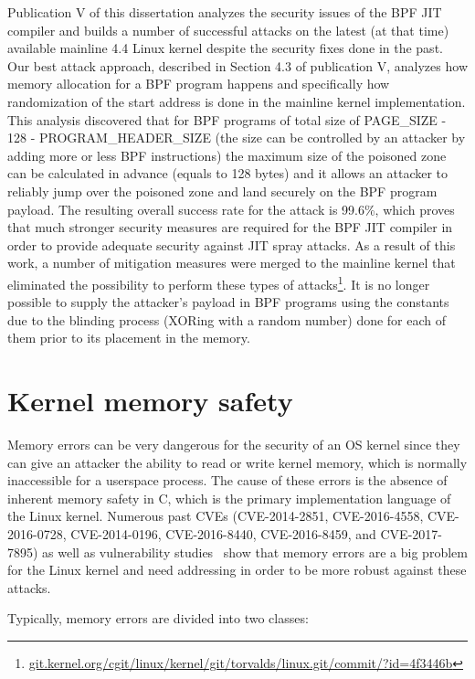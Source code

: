 Publication V of this dissertation analyzes the security issues of the BPF JIT compiler and builds a number of successful attacks on the latest (at that time) available mainline 4.4 Linux kernel despite the security fixes done in the past. 
Our best attack approach, described in Section 4.3 of publication V, analyzes how memory allocation for a BPF program happens and specifically how randomization of the start address is done in the mainline kernel implementation. 
This analysis discovered that for BPF programs of total size of PAGE\_SIZE - 128 - PROGRAM\_HEADER\_SIZE (the size can be controlled by an attacker by adding more or less BPF instructions) the maximum size of the poisoned zone can be calculated in advance (equals to 128 bytes) and it allows an attacker to reliably jump over the poisoned zone and land securely on the BPF program payload. The resulting overall success rate for the attack is 99.6\%, which proves that much stronger security measures are required for the BPF JIT compiler in order to provide adequate security against JIT spray attacks. As a result of this work, a number of mitigation measures were merged to the mainline kernel that eliminated the possibility to perform these types of attacks\footnote{\url{git.kernel.org/cgit/linux/kernel/git/torvalds/linux.git/commit/?id=4f3446b}}. It is no longer possible to supply the attacker's payload in BPF programs using the constants due to the blinding process (XORing with a random number) done for each of them prior to its placement in the memory.

\section{Kernel memory safety}
\label{sec:kern-mem-safety}

Memory errors can be very dangerous for the security of an OS kernel since they can give an attacker the ability to read or write kernel memory, which is normally inaccessible for a userspace process. The cause of these errors is the absence of inherent memory safety in C, which is the primary implementation language of the Linux kernel. 
Numerous past CVEs (CVE-2014-2851, CVE-2016-4558, CVE-2016-0728, CVE-2014-0196, CVE-2016-8440, CVE-2016-8459, and CVE-2017-7895) as well as vulnerability studies~\cite{raheja2016analysis, chen2011linux} show that memory errors are a big problem for the Linux kernel and need addressing in order to be more robust against these attacks.

Typically, memory errors are divided into two classes:


